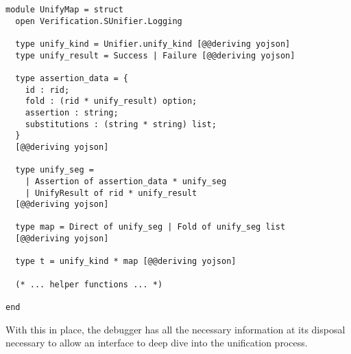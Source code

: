 \begin{lstlisting}[caption={
  The types of the \texttt{Debugger.UnifyMap} module
  \label{lst:unifymap}}, style=code, numbers=none]
module UnifyMap = struct
  open Verification.SUnifier.Logging

  type unify_kind = Unifier.unify_kind [@@deriving yojson]
  type unify_result = Success | Failure [@@deriving yojson]

  type assertion_data = {
    id : rid;
    fold : (rid * unify_result) option;
    assertion : string;
    substitutions : (string * string) list;
  }
  [@@deriving yojson]

  type unify_seg =
    | Assertion of assertion_data * unify_seg
    | UnifyResult of rid * unify_result
  [@@deriving yojson]

  type map = Direct of unify_seg | Fold of unify_seg list
  [@@deriving yojson]

  type t = unify_kind * map [@@deriving yojson]

  (* ... helper functions ... *)

end
\end{lstlisting}

With this in place, the debugger has all the necessary information at its
disposal necessary to allow an interface to deep dive into the unification
process.
